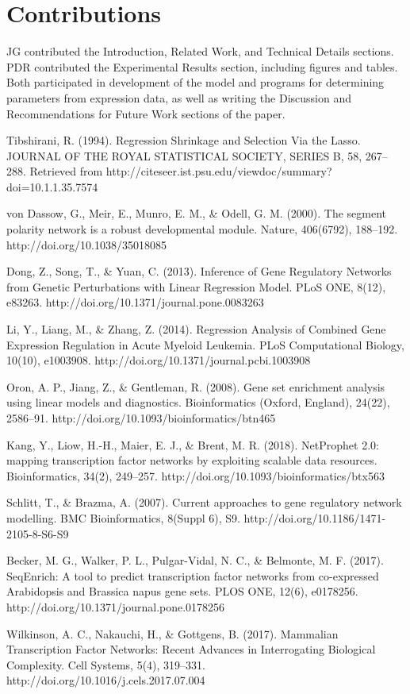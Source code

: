 \documentclass[paper=a4, fontsize=11pt]{scrartcl} %
\begin{document}
\section{Contributions}
JG contributed the Introduction, Related Work, and Technical Details sections. PDR contributed the Experimental Results section, including figures and tables. Both participated in development of the model and programs for determining parameters from expression data, as well as writing the Discussion and Recommendations for Future Work sections of the paper.

\begin{thebibliography}{1}
\bibitem{}
Tibshirani, R. (1994). Regression Shrinkage and Selection Via the Lasso. JOURNAL OF THE ROYAL STATISTICAL SOCIETY, SERIES B, 58, 267--288. Retrieved from http://citeseer.ist.psu.edu/viewdoc/summary?doi=10.1.1.35.7574

\bibitem{}
von Dassow, G., Meir, E., Munro, E. M., \& Odell, G. M. (2000). The segment polarity network is a robust developmental module. Nature, 406(6792), 188–192. http://doi.org/10.1038/35018085

\bibitem{}
Dong, Z., Song, T., \& Yuan, C. (2013). Inference of Gene Regulatory Networks from Genetic Perturbations with Linear Regression Model. PLoS ONE, 8(12), e83263. http://doi.org/10.1371/journal.pone.0083263

\bibitem{}
Li, Y., Liang, M., \& Zhang, Z. (2014). Regression Analysis of Combined Gene Expression Regulation in Acute Myeloid Leukemia. PLoS Computational Biology, 10(10), e1003908. http://doi.org/10.1371/journal.pcbi.1003908

\bibitem{}
Oron, A. P., Jiang, Z., \& Gentleman, R. (2008). Gene set enrichment analysis using linear models and diagnostics. Bioinformatics (Oxford, England), 24(22), 2586–91. http://doi.org/10.1093/bioinformatics/btn465

\bibitem{}
Kang, Y., Liow, H.-H., Maier, E. J., \& Brent, M. R. (2018). NetProphet 2.0: mapping transcription factor networks by exploiting scalable data resources. Bioinformatics, 34(2), 249–257. http://doi.org/10.1093/bioinformatics/btx563

\bibitem{}
Schlitt, T., \& Brazma, A. (2007). Current approaches to gene regulatory network modelling. BMC Bioinformatics, 8(Suppl 6), S9. http://doi.org/10.1186/1471-2105-8-S6-S9

\bibitem{}
Becker, M. G., Walker, P. L., Pulgar-Vidal, N. C., \& Belmonte, M. F. (2017). SeqEnrich: A tool to predict transcription factor networks from co-expressed Arabidopsis and Brassica napus gene sets. PLOS ONE, 12(6), e0178256. http://doi.org/10.1371/journal.pone.0178256

\bibitem{}
Wilkinson, A. C., Nakauchi, H., \& Gottgens, B. (2017). Mammalian Transcription Factor Networks: Recent Advances in Interrogating Biological Complexity. Cell Systems, 5(4), 319–331. http://doi.org/10.1016/j.cels.2017.07.004

\end{thebibliography}
\end{document}
